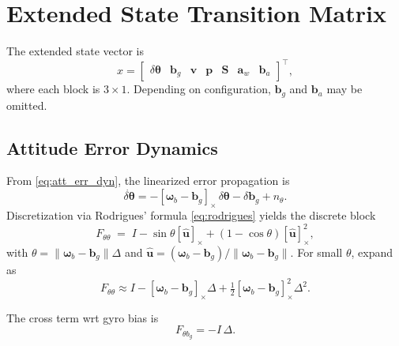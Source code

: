 \documentclass[10pt]{extarticle}
\begin{document}
\section{Extended State Transition Matrix}
\label{sec:transition}

The extended state vector is
\begin{equation}
x = \begin{bmatrix}
\delta\bm\theta & \bm b_g & \bm v & \bm p & \bm S & \bm a_w & \bm b_a
\end{bmatrix}^\top,
\label{eq:state-vector}
\end{equation}
where each block is $3\times 1$. Depending on configuration, $\bm b_g$ and $\bm b_a$ may be omitted.

\subsection{Attitude Error Dynamics}
From \eqref{eq:att_err_dyn}, the linearized error propagation is
\begin{equation}
\dot{\delta\bm\theta} = -[\bm\omega_b - \bm b_g]_\times \,\delta\bm\theta - \delta\bm b_g + n_\theta.
\label{eq:att-err-dyn2}
\end{equation}
Discretization via Rodrigues’ formula \eqref{eq:rodrigues} yields the discrete block
\begin{equation}
F_{\theta\theta} \;=\; I - \sin\theta [\hat{\bm u}]_\times + (1-\cos\theta)[\hat{\bm u}]_\times^2,
\label{eq:F-att}
\end{equation}
with $\theta = \|\bm\omega_b-\bm b_g\|\Delta$ and $\hat{\bm u}=(\bm\omega_b-\bm b_g)/\|\bm\omega_b-\bm b_g\|$.
For small $\theta$, expand as
\[
F_{\theta\theta} \approx I - [\bm\omega_b-\bm b_g]_\times \Delta + \tfrac{1}{2}[\bm\omega_b-\bm b_g]_\times^2 \Delta^2.
\]

The cross term wrt gyro bias is
\begin{equation}
F_{\theta b_g} = -I\,\Delta.
\label{eq:F-att-bg}
\end{equation}
\end{document}
